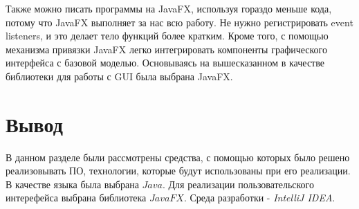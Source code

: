 Также можно писать программы на JavaFX, используя гораздо меньше кода, потому что JavaFX выполняет за нас всю работу. Не нужно регистрировать event listeners, и это делает тело функций более кратким. Кроме того, с помощью механизма привязки JavaFX легко интегрировать компоненты графического интерфейса с базовой моделью. Основываясь на вышесказанном в качестве библиотеки для работы с GUI была выбрана JavaFX.


\section*{Вывод}

В данном разделе были рассмотрены средства, с помощью которых было решено реализовывать ПО, технологии, которые будут использованы при его реализации. В качестве языка была выбрана $Java$.  Для реализации пользовательского интерефейса выбрана библиотека $JavaFX$. Среда разработки -  \textit{IntelliJ IDEA}.
